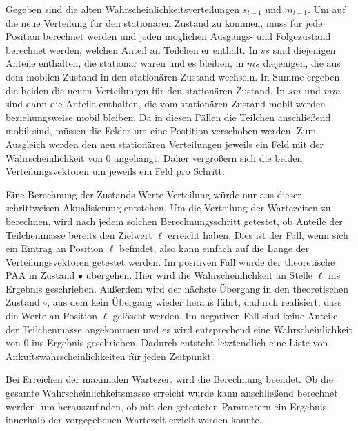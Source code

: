 Gegeben sind die alten Wahrscheinlichkeitsverteilungen $s_{t-1}$ und $m_{t-1}$.
Um auf die neue Verteilung für den stationären Zustand zu kommen, muss für jede Position berechnet werden und jeden möglichen Ausgangs- und Folgezustand berechnet werden, welchen Anteil an Teilchen er enthält. 
In $ss$ sind diejenigen Anteile enthalten, die stationär waren und es bleiben, in $ms$ diejenigen, die aus dem mobilen Zustand in den stationären Zustand wechseln. In Summe ergeben die beiden die neuen Verteilungen für den stationären Zustand.
In $sm$ und $mm$ sind dann die Anteile enthalten, die vom stationären Zustand mobil werden beziehungsweise mobil bleiben. Da in diesen Fällen die Teilchen anschließend mobil sind, müssen die Felder um eine Postition verschoben werden. Zum Ausgleich werden den neu stationären Verteilungen jeweils ein Feld mit der Wahrscheinlichkeit von $0$ angehängt.
Daher vergrößern sich die beiden Verteilungsvektoren um jeweils ein Feld pro Schritt.

Eine Berechnung der Zustands-Werte Verteilung würde nur aus dieser schrittweisen Akualisierung entstehen. Um die Verteilung der Wartezeiten zu berechnen, wird nach jedem solchen Berechnungsschritt getestet, ob Anteile der Teilchenmasse bereits den Zielwert $\ell$ erreicht haben. Dies ist der Fall, wenn sich ein Eintrag an Position $\ell$ befindet, also kann einfach auf die Länge der Verteilungsvektoren getestet werden. Im positiven Fall würde der theoretische PAA in Zustand $\bullet$ übergehen. Hier wird die Wahrscheinlichkeit an Stelle $\ell$ ins Ergebnis geschrieben. Außerdem wird der nächste Übergang in den theoretischen Zustand $\circ$, aus dem kein Übergang wieder heraus führt, dadurch realisiert, dass die Werte an Position $\ell$ gelöscht werden.
Im negativen Fall sind keine Anteile der Teilchenmasse angekommen und es wird entsprechend eine Wahrscheinlichkeit von $0$ ins Ergebnis geschrieben.
Dadurch entsteht letztendlich eine Liste von Ankuftswahrscheinlichkeiten für jeden Zeitpunkt.

Bei Erreichen der maximalen Wartezeit wird die Berechnung beendet. Ob die gesamte Wahrscheinlichkeitsmasse erreicht wurde kann anschließend berechnet werden, um herauszufinden, ob mit den getesteten Parametern ein Ergebnis innerhalb der vorgegebenen Wartezeit erzielt werden konnte. 

